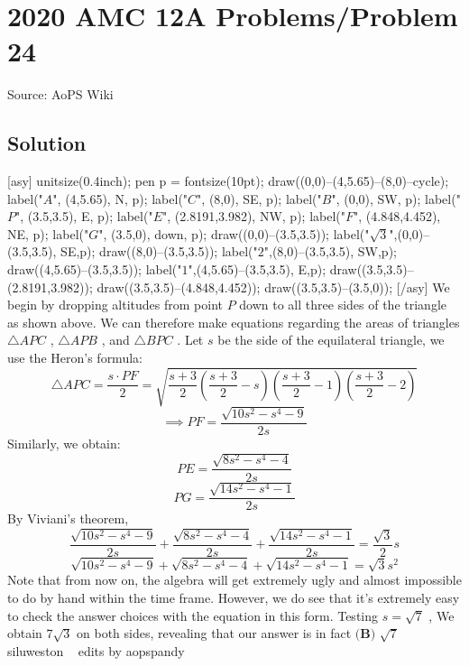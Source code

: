 \documentclass[12pt]{article}
\begin{document}
\section*{{2020 AMC 12A Problems/Problem 24}}
Source: AoPS Wiki

\subsection*{Solution}
[asy] unitsize(0.4inch); pen p = fontsize(10pt); draw((0,0)--(4,5.65)--(8,0)--cycle); label("$A$", (4,5.65), N, p); label("$C$", (8,0), SE, p); label("$B$", (0,0), SW, p); label("$P$", (3.5,3.5), E, p); label("$E$", (2.8191,3.982), NW, p); label("$F$", (4.848,4.452), NE, p); label("$G$", (3.5,0), down, p); draw((0,0)--(3.5,3.5)); label("$\sqrt{3}$",(0,0)--(3.5,3.5), SE,p); draw((8,0)--(3.5,3.5)); label("$2$",(8,0)--(3.5,3.5), SW,p); draw((4,5.65)--(3.5,3.5)); label("$1$",(4,5.65)--(3.5,3.5), E,p); draw((3.5,3.5)--(2.8191,3.982)); draw((3.5,3.5)--(4.848,4.452)); draw((3.5,3.5)--(3.5,0)); [/asy] We begin by dropping altitudes from point $P$ down to all three sides of the triangle as shown above. We can therefore make equations regarding the areas of triangles $\triangle{APC}$ , $\triangle{APB}$ , and $\triangle{BPC}$ . Let $s$ be the side of the equilateral triangle, we use the Heron's formula: \[\triangle{APC} = \frac{s\cdot PF}{2} = \sqrt{\frac{s+3}{2}\left(\frac{s+3}{2}-s\right)\left(\frac{s+3}{2}-1\right)\left(\frac{s+3}{2}-2\right)}\] \[\implies PF = \frac{\sqrt{10s^2-s^4-9}}{2s}\] Similarly, we obtain: \[PE = \frac{\sqrt{8s^2-s^4-4}}{2s}\] \[PG = \frac{\sqrt{14s^2-s^4-1}}{2s}\] By Viviani's theorem, \[\frac{\sqrt{10s^2-s^4-9}}{2s}+\frac{\sqrt{8s^2-s^4-4}}{2s}+\frac{\sqrt{14s^2-s^4-1}}{2s} = \frac{\sqrt{3}}{2}s\] \[\sqrt{10s^2-s^4-9}+\sqrt{8s^2-s^4-4}+\sqrt{14s^2-s^4-1} = \sqrt{3}s^2\] Note that from now on, the algebra will get extremely ugly and almost impossible to do by hand within the time frame. However, we do see that it's extremely easy to check the answer choices with the equation in this form. Testing $s = \sqrt{7}$ , We obtain $7\sqrt{3}$ on both sides, revealing that our answer is in fact $\boxed{\textbf{(B) } \sqrt{7}}$ ~ siluweston
~ edits by aopspandy
\end{document}
